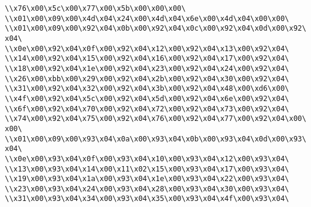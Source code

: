 \verb|\\x76\x00\x5c\x00\x77\x00\x5b\x00\x00\x00\|\newline
\verb|\\x01\x00\x09\x00\x4d\x04\x24\x00\x4d\x04\x6e\x00\x4d\x04\x00\x00\|\newline
\verb|\\x01\x00\x09\x00\x92\x04\x0b\x00\x92\x04\x0c\x00\x92\x04\x0d\x00\x92\x04\|\newline
\verb|\\x0e\x00\x92\x04\x0f\x00\x92\x04\x12\x00\x92\x04\x13\x00\x92\x04\|\newline
\verb|\\x14\x00\x92\x04\x15\x00\x92\x04\x16\x00\x92\x04\x17\x00\x92\x04\|\newline
\verb|\\x18\x00\x92\x04\x1e\x00\x92\x04\x23\x00\x92\x04\x24\x00\x92\x04\|\newline
\verb|\\x26\x00\xbb\x00\x29\x00\x92\x04\x2b\x00\x92\x04\x30\x00\x92\x04\|\newline
\verb|\\x31\x00\x92\x04\x32\x00\x92\x04\x3b\x00\x92\x04\x48\x00\xd6\x00\|\newline
\verb|\\x4f\x00\x92\x04\x5c\x00\x92\x04\x5d\x00\x92\x04\x6e\x00\x92\x04\|\newline
\verb|\\x6f\x00\x92\x04\x70\x00\x92\x04\x72\x00\x92\x04\x73\x00\x92\x04\|\newline
\verb|\\x74\x00\x92\x04\x75\x00\x92\x04\x76\x00\x92\x04\x77\x00\x92\x04\x00\x00\|\newline
\verb|\\x01\x00\x09\x00\x93\x04\x0a\x00\x93\x04\x0b\x00\x93\x04\x0d\x00\x93\x04\|\newline
\verb|\\x0e\x00\x93\x04\x0f\x00\x93\x04\x10\x00\x93\x04\x12\x00\x93\x04\|\newline
\verb|\\x13\x00\x93\x04\x14\x00\x11\x02\x15\x00\x93\x04\x17\x00\x93\x04\|\newline
\verb|\\x19\x00\x93\x04\x1a\x00\x93\x04\x1e\x00\x93\x04\x22\x00\x93\x04\|\newline
\verb|\\x23\x00\x93\x04\x24\x00\x93\x04\x28\x00\x93\x04\x30\x00\x93\x04\|\newline
\verb|\\x31\x00\x93\x04\x34\x00\x93\x04\x35\x00\x93\x04\x4f\x00\x93\x04\|\newline
